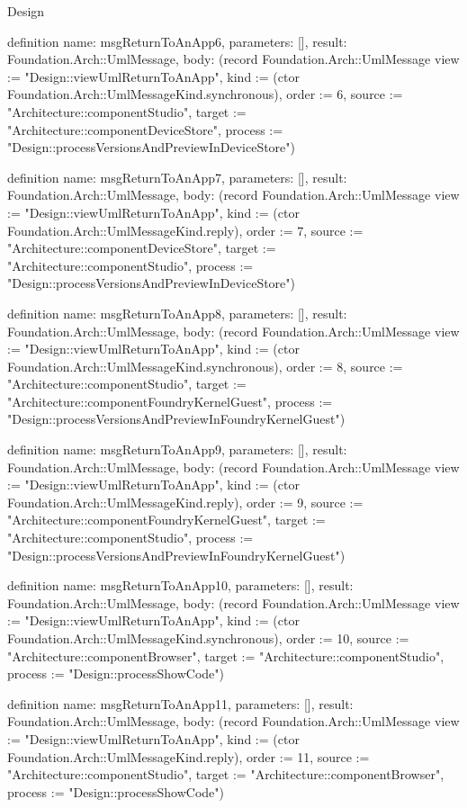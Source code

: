 \begin{lexlean}{Design}
\begin{semanticmodule}
definition{
  name: msgReturnToAnApp6,
  parameters: [],
  result: Foundation.Arch::UmlMessage,
  body: (record Foundation.Arch::UmlMessage {view := "Design::viewUmlReturnToAnApp", kind := (ctor Foundation.Arch::UmlMessageKind.synchronous), order := 6, source := "Architecture::componentStudio", target := "Architecture::componentDeviceStore", process := "Design::processVersionsAndPreviewInDeviceStore"})
}

definition{
  name: msgReturnToAnApp7,
  parameters: [],
  result: Foundation.Arch::UmlMessage,
  body: (record Foundation.Arch::UmlMessage {view := "Design::viewUmlReturnToAnApp", kind := (ctor Foundation.Arch::UmlMessageKind.reply), order := 7, source := "Architecture::componentDeviceStore", target := "Architecture::componentStudio", process := "Design::processVersionsAndPreviewInDeviceStore"})
}

definition{
  name: msgReturnToAnApp8,
  parameters: [],
  result: Foundation.Arch::UmlMessage,
  body: (record Foundation.Arch::UmlMessage {view := "Design::viewUmlReturnToAnApp", kind := (ctor Foundation.Arch::UmlMessageKind.synchronous), order := 8, source := "Architecture::componentStudio", target := "Architecture::componentFoundryKernelGuest", process := "Design::processVersionsAndPreviewInFoundryKernelGuest"})
}

definition{
  name: msgReturnToAnApp9,
  parameters: [],
  result: Foundation.Arch::UmlMessage,
  body: (record Foundation.Arch::UmlMessage {view := "Design::viewUmlReturnToAnApp", kind := (ctor Foundation.Arch::UmlMessageKind.reply), order := 9, source := "Architecture::componentFoundryKernelGuest", target := "Architecture::componentStudio", process := "Design::processVersionsAndPreviewInFoundryKernelGuest"})
}

definition{
  name: msgReturnToAnApp10,
  parameters: [],
  result: Foundation.Arch::UmlMessage,
  body: (record Foundation.Arch::UmlMessage {view := "Design::viewUmlReturnToAnApp", kind := (ctor Foundation.Arch::UmlMessageKind.synchronous), order := 10, source := "Architecture::componentBrowser", target := "Architecture::componentStudio", process := "Design::processShowCode"})
}

definition{
  name: msgReturnToAnApp11,
  parameters: [],
  result: Foundation.Arch::UmlMessage,
  body: (record Foundation.Arch::UmlMessage {view := "Design::viewUmlReturnToAnApp", kind := (ctor Foundation.Arch::UmlMessageKind.reply), order := 11, source := "Architecture::componentStudio", target := "Architecture::componentBrowser", process := "Design::processShowCode"})
}


\end{semanticmodule}
\end{lexlean}
